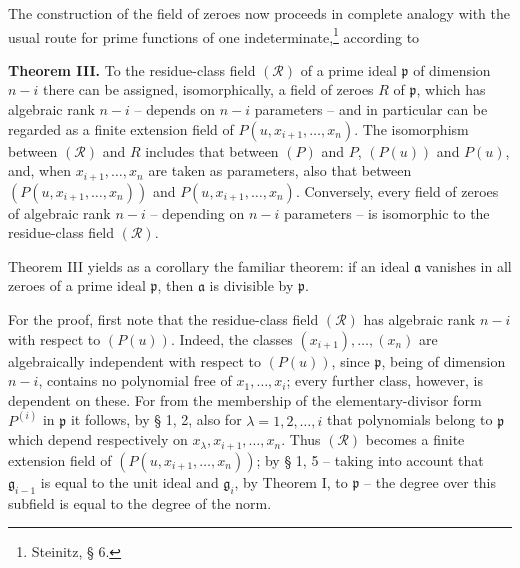 \documentclass[11pt]{article}
\providecommand{\frakp}{\mathfrak p}
\providecommand{\fraka}{\mathfrak a}
\providecommand{\frakg}{\mathfrak g}
\begin{document}
The construction of the field of zeroes now proceeds in complete analogy with the usual route for prime functions of one indeterminate,\footnote{Steinitz, § 6.} according to

\textbf{Theorem III.} To the residue-class field $(\mathcal R)$ of a prime ideal $\frakp$ of dimension $n-i$ there can be assigned, isomorphically, a field of zeroes $R$ of $\frakp$, which has algebraic rank $n-i$ -- depends on $n-i$ parameters -- and in particular can be regarded as a finite extension field of $P(u,x_{i+1},\ldots,x_n)$. The isomorphism between $(\mathcal R)$ and $R$ includes that between $(P)$ and $P$, $(P(u))$ and $P(u)$, and, when $x_{i+1},\ldots,x_n$ are taken as parameters, also that between $(P(u,x_{i+1},\ldots,x_n))$ and $P(u,x_{i+1},\ldots,x_n)$. Conversely, every field of zeroes of algebraic rank $n-i$ -- depending on $n-i$ parameters -- is isomorphic to the residue-class field $(\mathcal R)$.

Theorem III yields as a corollary the familiar theorem: if an ideal $\fraka$ vanishes in all zeroes of a prime ideal $\frakp$, then $\fraka$ is divisible by $\frakp$.

For the proof, first note that the residue-class field $(\mathcal R)$ has algebraic rank $n-i$ with respect to $(P(u))$. Indeed, the classes $(x_{i+1}),\ldots,(x_n)$ are algebraically independent with respect to $(P(u))$, since $\frakp$, being of dimension $n-i$, contains no polynomial free of $x_1,\ldots,x_i$; every further class, however, is dependent on these. For from the membership of the elementary-divisor form $P^{(i)}$ in $\frakp$ it follows, by § 1, 2, also for $\lambda=1,2,\ldots,i$ that polynomials belong to $\frakp$ which depend respectively on $x_\lambda,x_{i+1},\ldots,x_n$. Thus $(\mathcal R)$ becomes a finite extension field of $(P(u,x_{i+1},\ldots,x_n))$; by § 1, 5 -- taking into account that $\frakg_{i-1}$ is equal to the unit ideal and $\frakg_i$, by Theorem I, to $\frakp$ -- the degree over this subfield is equal to the degree of the norm.
\end{document}
